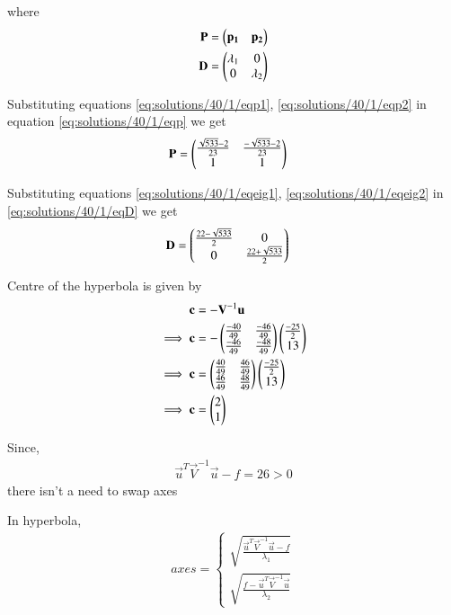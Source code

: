 where 
\begin{align}
        \mathbf{P}&=\begin{pmatrix}\mathbf{p_1} & \mathbf{p_2}\end{pmatrix}\label{eq:solutions/40/1/eqp}\\
    \mathbf{D}&=\begin{pmatrix}\lambda_1 & 0 \\0 & \lambda_2\end{pmatrix}\label{eq:solutions/40/1/eqD}
\end{align}

Substituting equations \ref{eq:solutions/40/1/eqp1}, \ref{eq:solutions/40/1/eqp2} in equation \ref{eq:solutions/40/1/eqp} we get 
\begin{align}
    \mathbf{P}&=\begin{pmatrix}\frac{\sqrt{533}-2}{23} & \frac{-\sqrt{533}-2}{23} \\1 & 1\end{pmatrix}\label{eq:solutions/40/1/eqP}
\end{align}

Substituting equations \ref{eq:solutions/40/1/eqeig1}, \ref{eq:solutions/40/1/eqeig2} in \ref{eq:solutions/40/1/eqD} we get
\begin{align}
       \mathbf{D}&=\begin{pmatrix}\frac{22-\sqrt{533}}{2} & 0\\0 & \frac{22+\sqrt{533}}{2}\end{pmatrix}\label{eq:solutions/40/1/eqDD}
\end{align}

Centre of the hyperbola is given by 
\begin{align}
    \mathbf{c}&=-\mathbf{V}^{-1}\mathbf{u}\\
    \implies\mathbf{c}&=-\begin{pmatrix}\frac{-40}{49}&\frac{-46}{49}\\\frac{-46}{49}&\frac{-48}{49}\end{pmatrix}\begin{pmatrix}\frac{-25}{2} \\ 13\end{pmatrix}\\
    \implies\mathbf{c}&=\begin{pmatrix}\frac{40}{49}&\frac{46}{49}\\\frac{46}{49}&\frac{48}{49}\end{pmatrix}\begin{pmatrix}\frac{-25}{2} \\ 13\end{pmatrix}\\
    \implies\mathbf{c}&=\begin{pmatrix}2\\1\end{pmatrix}
\end{align}

Since,
\begin{align}
    \vec{u}^T\vec{V}^{-1}\vec{u}-f = 26 > 0\label{eq:solutions/40/1/cond}
\end{align} 
there isn't a need to swap axes

In hyperbola,
\begin{align}
axes=
\begin{cases}
\sqrt{\frac{\vec{u}^T\vec{V}^{-1}\vec{u}-f}{\lambda_1}}\\ \sqrt{\frac{f-\vec{u}^T\vec{V}^{-1}\vec{u}}{\lambda_2}}
\end{cases}
\end{align}

